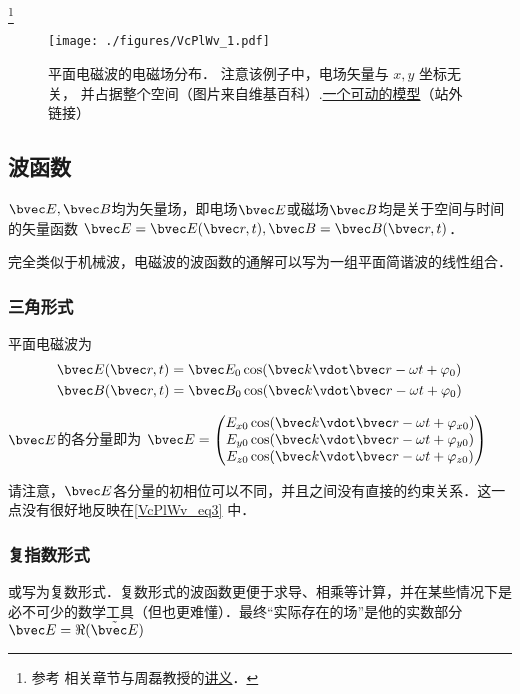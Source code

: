 

\footnote{参考 \cite{GriffE} 相关章节与周磊教授的\href{http://fdjpkc.fudan.edu.cn/d200927/2009/0314/c8569a14801/page.htm}{讲义}．}

\begin{figure}[ht]
\centering
\texttt{[image: ./figures/VcPlWv\_1.pdf]}
\caption{平面电磁波的电磁场分布． 注意该例子中，电场矢量与 $x, y$ 坐标无关， 并占据整个空间（图片来自维基百科）.\href{https://www.geogebra.org/m/xhYwXSsH}{一个可动的模型}（站外链接）} \label{VcPlWv_fig1}
\end{figure}

\subsection{波函数}
$\bvec E, \bvec B$均为矢量场，即电场$\bvec E$或磁场$\bvec B$均是关于空间与时间的矢量函数 $\bvec E = \bvec E(\bvec r, t), \bvec B = \bvec B(\bvec r, t)$．

完全类似于机械波，电磁波的波函数的通解可以写为一组平面简谐波的线性组合．

\subsubsection{三角形式}
平面电磁波为
\begin{align}\label{VcPlWv_eq3}
&\bvec E(\bvec r, t) = \bvec E_0 \cos(\bvec k\vdot \bvec r - \omega t + \varphi_0)\\
&\bvec B(\bvec r, t) = \bvec B_0 \cos(\bvec k \vdot \bvec r - \omega t + \varphi_0)
\end{align}

$\bvec E$的各分量即为
$\bvec E = 
\begin{pmatrix}
E_{x0} \cos(\bvec k\vdot \bvec r - \omega t+ \varphi_{x0})\\
E_{y0} \cos(\bvec k\vdot \bvec r - \omega t+ \varphi_{y0})\\
E_{z0} \cos(\bvec k\vdot \bvec r - \omega t+ \varphi_{z0})\\
\end{pmatrix}
$

请注意，$\bvec E$各分量的初相位可以不同，并且之间没有直接的约束关系．这一点没有很好地反映在\autoref{VcPlWv_eq3} 中．

\subsubsection{复指数形式}
或写为复数形式．复数形式的波函数更便于求导、相乘等计算，并在某些情况下是必不可少的数学工具（但也更难懂）．最终“实际存在的场”是他的实数部分 $\bvec E = \Re (\tilde {\bvec E})$

